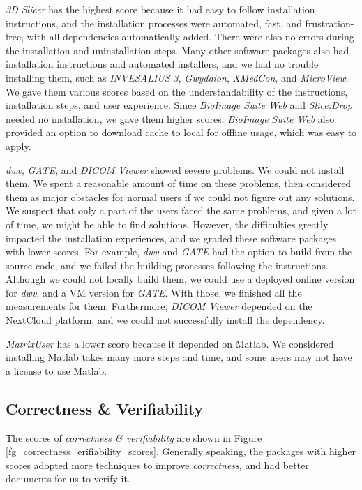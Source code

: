 \documentclass[preprint,12pt,authoryear]{elsarticle}
\begin{document}
\textit{3D Slicer} has the highest score because it had easy to follow
installation instructions, and the installation processes were automated, fast,
and frustration-free, with all dependencies automatically added. There were also
no errors during the installation and uninstallation steps. Many other software
packages also had installation instructions and automated installers, and we had
no trouble installing them, such as \textit{INVESALIUS 3}, \textit{Gwyddion},
\textit{XMedCon}, and \textit{MicroView}. We gave them various scores based on
the understandability of the instructions, installation steps, and user
experience. Since \textit{BioImage Suite Web} and \textit{Slice:Drop} needed no
installation, we gave them higher scores. \textit{BioImage Suite Web} also
provided an option to download cache to local for offline usage, which was easy
to apply.

\textit{dwv}, \textit{GATE}, and \textit{DICOM Viewer} showed severe problems.
We could not install them. We spent a reasonable amount of time on these
problems, then considered them as major obstacles for normal users if we could
not figure out any solutions. We suspect that only a part of the users faced the
same problems, and given a lot of time, we might be able to find solutions.
However, the difficulties greatly impacted the installation experiences, and we
graded these software packages with lower scores. For example, \textit{dwv} and
\textit{GATE} had the option to build from the source code, and we failed the
building processes following the instructions. Although we could not locally
build them, we could use a deployed online version for \textit{dwv}, and a VM
version for \textit{GATE}. With those, we finished all the measurements for
them. Furthermore, \textit{DICOM Viewer} depended on the NextCloud platform, and
we could not successfully install the dependency.

\textit{MatrixUser} has a lower score because it depended on Matlab. We
considered installing Matlab takes many more steps and time, and some users may
not have a license to use Matlab.

\subsection{Correctness \& Verifiability} \label{sec_result_correctness_verifiability}

The scores of \textit{correctness \& verifiability} are shown in Figure
\ref{fg_correctness_erifiability_scores}. Generally speaking, the packages with
higher scores adopted more techniques to improve \textit{correctness}, and had
better documents for us to verify it.
\end{document}
